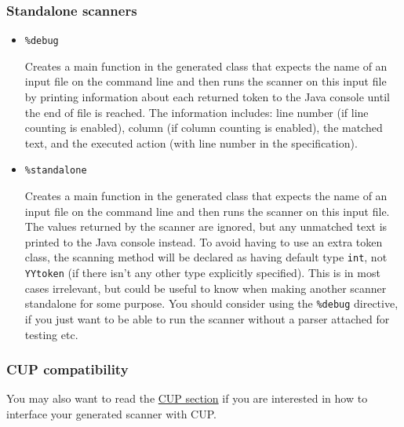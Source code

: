 \subsubsection{Standalone scanners}\label{standalone-scanners}

\begin{itemize}
\item
  \texttt{\%debug}

  Creates a main function in the generated class that expects the name
  of an input file on the command line and then runs the scanner on this
  input file by printing information about each returned token to the
  Java console until the end of file is reached. The information
  includes: line number (if line counting is enabled), column (if column
  counting is enabled), the matched text, and the executed action (with
  line number in the specification).
\item
  \texttt{\%standalone}

  Creates a main function in the generated class that expects the name
  of an input file on the command line and then runs the scanner on this
  input file. The values returned by the scanner are ignored, but any
  unmatched text is printed to the Java console instead. To avoid having
  to use an extra token class, the scanning method will be declared as
  having default type \texttt{int}, not \texttt{YYtoken} (if there isn't
  any other type explicitly specified). This is in most cases
  irrelevant, but could be useful to know when making another scanner
  standalone for some purpose. You should consider using the
  \texttt{\%debug} directive, if you just want to be able to run the
  scanner without a parser attached for testing etc.
\end{itemize}

\subsubsection{CUP compatibility}\label{cup-compatibility}

You may also want to read the \hyperref[CUPWork]{CUP section} if you are
interested in how to interface your generated scanner with CUP.

